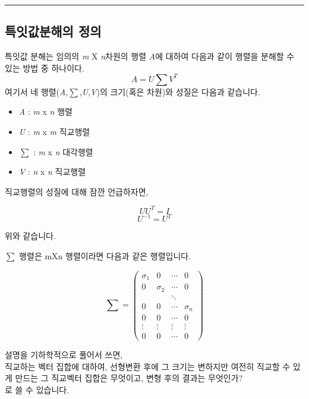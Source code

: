 \documentclass[
]{article}
\providecommand{\tightlist}{%
  \setlength{\itemsep}{0pt}\setlength{\parskip}{0pt}}
\begin{document}
\begin{center}\rule{0.5\linewidth}{0.5pt}\end{center}

\hypertarget{uxd2b9uxc787uxac12uxbd84uxd574uxc758-uxc815uxc758}{%
\subsection{특잇값분해의
정의}\label{uxd2b9uxc787uxac12uxbd84uxd574uxc758-uxc815uxc758}}

특잇값 분해는 임의의 \emph{m} X \emph{n}차원의 행렬 \emph{A}에 대하여
다음과 같이 행렬을 분해할 수 있는 방법 중 하나이다. \[
A = U\sum V^T
\] 여기서 네 행렬(\emph{A},\emph{\(\sum\)},\emph{U},\emph{V})의
크기(혹은 차원)와 성질은 다음과 같습니다.

\begin{itemize}
\tightlist
\item
  \emph{A} : \emph{m} x \emph{n} 행렬
\item
  \emph{U} : \emph{m} x \emph{m} 직교행렬
\item
  \emph{\(\sum\)} : \emph{m} x \emph{n} 대각행렬
\item
  \emph{V} : \emph{n} x \emph{n} 직교행렬
\end{itemize}

직교행렬의 성질에 대해 잠깐 언급하자면,

\[
UU^T = I
\] \[
U^{-1} = U^T
\]

위와 같습니다.

\emph{\(\sum\)} 행렬은 mXn 행렬이라면 다음과 같은 행렬입니다.

\begin{equation*}
\sum = 
\begin{pmatrix}
\sigma_{1} &      0       &      \cdots     &     0      \\
0          &  \sigma_{2}  &      \cdots     &     0      \\
           &              &      \ddots     &             \\
0          &      0       &      \cdots     & \sigma_{n}  \\
0          &      0       &      \cdots     &      0       \\
\vdots     &    \vdots    &      \vdots     &  \vdots      \\
0          &      0       &      \cdots     &      0
\end{pmatrix}
\end{equation*}

설명을 기하학적으로 풀어서 쓰면,\\
직교하는 벡터 집합에 대하여, 선형변환 후에 그 크기는 변하지만 여전히
직교할 수 있게 만드는 그 직교벡터 집합은 무엇이고, 변형 후의 결과는
무엇인가?\\
로 쓸 수 있습니다.
\end{document}
